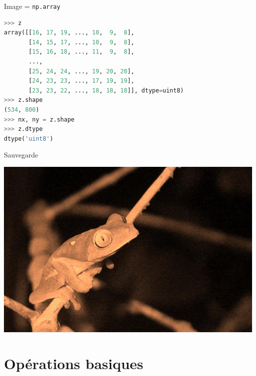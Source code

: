 \documentclass[8pt,a4paper]{beamer}
\begin{document}
\begin{frame}[containsverbatim]{Image = \verb!np.array!}
    
  \begin{lstlisting}[language=Python]
>>> z
array([[16, 17, 19, ..., 10,  9,  8],
       [14, 15, 17, ..., 10,  9,  8],
       [15, 16, 18, ..., 11,  9,  8],
       ..., 
       [25, 24, 24, ..., 19, 20, 20],
       [24, 23, 23, ..., 17, 19, 19],
       [23, 23, 22, ..., 18, 18, 18]], dtype=uint8)
>>> z.shape
(534, 800)
>>> nx, ny = z.shape
>>> z.dtype
dtype('uint8')
\end{lstlisting}
\end{frame}


\begin{frame}[containsverbatim]{Sauvegarde}
  \begin{center}
  \includegraphics[width=.6\textwidth]{figures/grenouille_saved.jpg} 
  \end{center}    
  
\end{frame}



\section{Opérations basiques}
\end{document}
